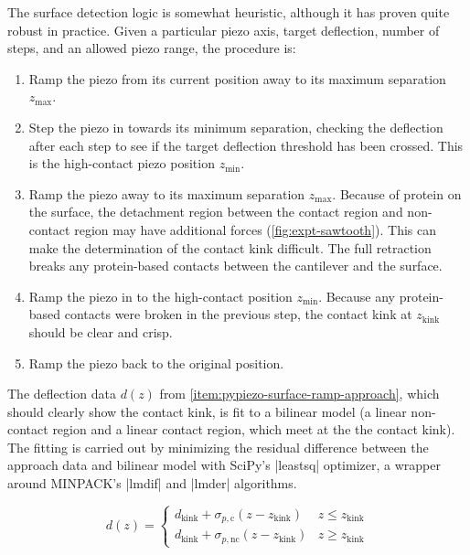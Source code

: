 The surface detection logic is somewhat heuristic, although it has
proven quite robust in practice.  Given a particular piezo axis,
target deflection, number of steps, and an allowed piezo range, the
procedure is:

\begin{enumerate}
  \item \label{item:pypiezo-surface-retract-1} Ramp the piezo from its
    current position away to its maximum separation $z_\text{max}$.
  \item \label{item:pypiezo-surface-step-approach} Step the piezo in
    towards its minimum separation, checking the deflection after each
    step to see if the target deflection threshold has been crossed.
    This is the high-contact piezo position $z_\text{min}$.
  \item \label{item:pypiezo-surface-retract-2} Ramp the piezo away to
    its maximum separation $z_\text{max}$.  Because of protein on the
    surface, the detachment region between the contact region and
    non-contact region may have additional forces
    (\cref{fig:expt-sawtooth}).  This can make the determination of
    the contact kink difficult.  The full retraction breaks any
    protein-based contacts between the cantilever and the surface.
  \item \label{item:pypiezo-surface-ramp-approach} Ramp the piezo in
    to the high-contact position $z_\text{min}$.  Because any
    protein-based contacts were broken in the previous step, the
    contact kink at $z_\text{kink}$ should be clear and crisp.
  \item \label{item:pypiezo-surface-reset} Ramp the piezo back to the
    original position.
\end{enumerate}

The deflection data $d(z)$ from
\ref{item:pypiezo-surface-ramp-approach}, which should clearly show
the contact kink, is fit to a bilinear model (a linear non-contact
region and a linear contact region, which meet at the the contact
kink).  The fitting is carried out by minimizing the residual
difference between the approach data and bilinear model with SciPy's
|leastsq| optimizer, a wrapper around MINPACK's
|lmdif| and |lmder|
algorithms\citep{scipy-leastsq,minpack}.

\begin{equation}
  d(z) = \begin{cases}
      d_\text{kink} + \sigma_{p,\text{c}} (z - z_\text{kink})
        &  z \le z_\text{kink} \\
      d_\text{kink} + \sigma_{p,\text{nc}} (z - z_\text{kink})
        &  z \ge z_\text{kink}
    \end{cases}
  \label{eq:bilinear-surface}
\end{equation}

